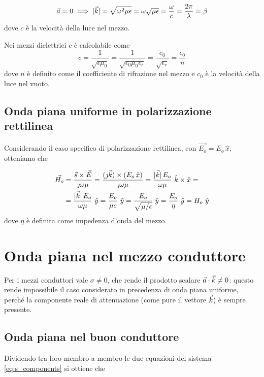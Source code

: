 		\begin{equation*}
				\vec{a} = 0 \implies |\vec{k}| = \sqrt{\omega^2 \mu \epsilon} = \omega \sqrt{\mu \epsilon} = \frac{\omega}{c} = \frac{2 \pi}{\lambda} = \beta
		\end{equation*}
		dove $c$ è la velocità della luce nel mezzo.

		Nei mezzi dielettrici $c$ è calcolabile come
		\begin{equation*}
				c = \frac{1}{\sqrt{\epsilon \mu_0}} = \frac{1}{\sqrt{\epsilon_0 \mu_0 \epsilon_r}} = \frac{c_0}{\sqrt{\epsilon_r}} = \frac{c_0}{n}
		\end{equation*}
		dove $n$ è definito come il coefficiente di rifrazione nel mezzo e $c_0$ è la velocità della luce nel vuoto.

	\subsection{Onda piana uniforme in polarizzazione rettilinea}
		Considerando il caso specifico di polarizzazione rettilinea, con $\vec{E_o} = E_o \, \hat{x}$, otteniamo che

		\begin{equation*} \begin{split}
			\vec{H_o} &= \frac{\vec{s} \times \vec{E}} {\jmath \omega \mu}
				= \frac{(\jmath \vec{k}) \times (E_o \, \hat{x})}{\jmath \omega \mu}
				= \frac{|\vec{k}| \, E_o}{\omega \mu} ~ \hat{k} \times \hat{x} = \\
			& = \frac{|\vec{k}| \, E_o}{\omega \mu} ~ \hat{y}
				= \frac{E_o}{\mu c} ~ \hat{y}
				= \frac{E_o}{\sqrt{\mu / \epsilon}} ~ \hat{y}
				= \frac{E_o}{\eta} ~ \hat{y}
				= H_o ~ \hat{y}
		\end{split} \end{equation*}
		dove $\eta$ è definita come impedenza d'onda del mezzo.

\section{Onda piana nel mezzo conduttore}
	Per i mezzi conduttori vale $\sigma \neq 0$, che rende il prodotto scalare $\vec{a} \cdot \vec{k} \neq 0$: questo rende impossibile il caso considerato in precedenza di onda piana uniforme, perché la componente reale di attenuazione (come pure il vettore $\vec{k}$) è sempre presente.

	\subsection{Onda piana nel buon conduttore} \label{sec:onda_piana_conduttore}
		Dividendo tra loro membro a membro le due equazioni del sistema \ref{eq:s_components} si ottiene che

